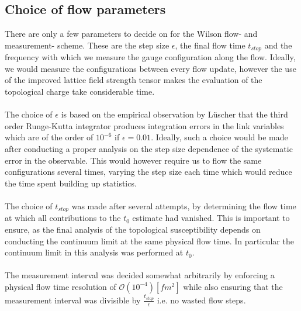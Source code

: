 \documentclass[a4paper,10pt]{book}
\begin{document}
\subsection{Choice of flow parameters}
There are only a few parameters to decide on for the Wilson flow- and measurement- scheme. These are the step size $\epsilon$, the final flow time $t_{stop}$ and the frequency with which we measure the gauge configuration along the flow. Ideally, we would measure the configurations between every flow update, however the use of the improved lattice field strength tensor makes the evaluation of the topological charge take considerable time.\\\\The choice of $\epsilon$ is based on the empirical observation by Lüscher \cite{Luscher2010} that the third order Runge-Kutta integrator produces integration errors in the link variables which are of the order of $10^{-6}$ if $\epsilon=0.01$. Ideally, such a choice would be made after conducting a proper analysis on the step size dependence of the systematic error in the observable. This would however require us to flow the same configurations several times, varying the step size each time which would reduce the time spent building up statistics.\\\\The choice of $t_{stop}$ was made after several attempts, by determining the flow time at which all contributions to the $t_0$ estimate had vanished. This is important to ensure, as the final analysis of the topological susceptibility depends on conducting the continuum limit at the same physical flow time. In particular the continuum limit in this analysis was performed at $t_0$.\\\\The measurement interval was decided somewhat arbitrarily by enforcing a physical flow time resolution of $\mathcal{O}(10^{-4})[fm^2]$ while also ensuring that the measurement interval was divisible by $\frac{t_{stop}}{\epsilon}$ i.e. no wasted  flow steps.
\end{document}
